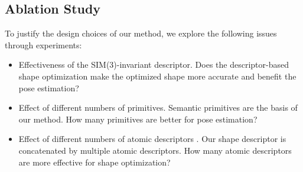 \documentclass{article}
\newcommand{\revise}[1]{\textcolor{revise}{#1}}
\begin{document}
\subsection{Ablation Study}
\label{sec:ablation}
\revise{
To justify the design choices of our method, we explore the following issues through experiments:
\begin{itemize}
\vspace{-0.1cm}
  \setlength\itemsep{0em}
    \item Effectiveness of the SIM(3)-invariant descriptor. Does the descriptor-based shape optimization make the optimized shape more accurate and benefit the pose estimation?
    \item Effect of different numbers of primitives. Semantic primitives are the basis of our method. How many primitives are better for pose estimation?
    \item Effect of different numbers of atomic descriptors . Our shape descriptor is concatenated by multiple atomic descriptors. How many atomic descriptors are more effective for shape optimization?
\end{itemize}
}
\end{document}

